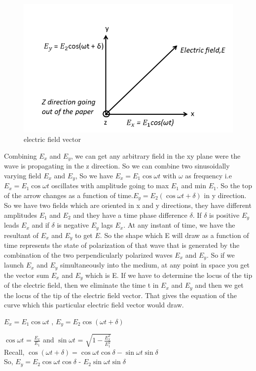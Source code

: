 \begin{figure}[h]
	\centering
	\includegraphics[width=1\linewidth]{./graphics/E_components}
	\caption{electric field vector}
	\label{electric field vector components}
\end{figure}
Combining $E_x$ and $E_y$, we can get any arbitrary field in the xy plane were the wave is propagating in the z direction. So we can combine two sinusoidally varying field $E_x$ and $E_y$, So we have $E_x = E_{1}\cos\omega t$ with $\omega$ as frequency i.e$ E_x = E_{1}\cos\omega t$ oscillates with amplitude going to max $E_{1}$ and min $E_{1}$. So the top of the arrow changes as a function of time.$ E_y  = E_{2}(\cos\omega t + \delta)$ in y direction. So we have two fields which are oriented in x and y directions, they have different amplitudes $E_{1}$ and $E_{2}$ and they have a time phase difference $\delta$. If $\delta$ is positive $E_y$ leads $E_x$ and if $\delta$ is negative $E_y$ lags $E_x$. At any instant of time, we have the resultant of $E_x$ and $E_y$ to get $E$. So the shape which E will draw as a function of time represents the state of polarization of that wave that is generated by the combination of the two perpendicularly polarized waves $E_x$ and $E_y$. So if we launch $E_x$ and $E_y$ simultaneously into the medium, at any point in space you get the vector sum $E_x$ and $E_y$ which is E. If we have to determine the locus of the tip of the electric field, then we eliminate the time t in $E_x$ and $E_y$ and then we get the locus of the tip of the electric field vector. That gives the equation of the curve which this particular electric field vector would draw.

$E_x = E_{1}\cos\omega t$ , $E_y  = E_{2}\cos(\omega t + \delta)$

$\cos\omega t$ = $\frac{E_x}{E_1}$ and $\sin\omega t$ = $\sqrt{1 - \frac{E_x^2}{E_{1}^2}}$
\\
Recall, $\cos(\omega t + \delta) = \cos\omega t\cos\delta - \sin\omega t\sin\delta$
\\
So,
 $E_y = E_{2}\cos\omega t\cos\delta$ - $E_{2}\sin\omega t\sin\delta$

